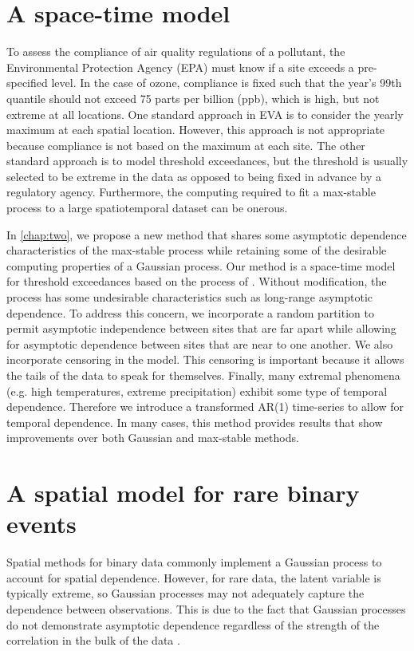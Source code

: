 \section{A space-time \skewt{} model}

To assess the compliance of air quality regulations of a pollutant, the Environmental Protection Agency (EPA) must know if a site exceeds a pre-specified level.
In the case of ozone, compliance is fixed such that the year's 99th quantile should not exceed 75 parts per billion (ppb), which is high, but not extreme at all locations.
One standard approach in EVA is to consider the yearly maximum at each spatial location.
However, this approach is not appropriate because compliance is not based on the maximum at each site.
The other standard approach is to model threshold exceedances, but the threshold is usually selected to be extreme in the data as opposed to being fixed in advance by a regulatory agency.
Furthermore, the computing required to fit a max-stable process to a large spatiotemporal dataset can be onerous.

In \cref{chap:two}, we propose a new method that shares some asymptotic dependence characteristics of the max-stable process while retaining some of the desirable computing properties of a Gaussian process.
Our method is a space-time model for threshold exceedances based on the \skewt{} process of \citet{Azzalini2014}.
Without modification, the \skewt{} process has some undesirable characteristics such as long-range asymptotic dependence.
To address this concern, we incorporate a random partition to permit asymptotic independence between sites that are far apart while allowing for asymptotic dependence between sites that are near to one another.
We also incorporate censoring in the model.
This censoring is important because it allows the tails of the data to speak for themselves. 
Finally, many extremal phenomena (e.g. high temperatures, extreme precipitation) exhibit some type of temporal dependence.
Therefore we introduce a transformed AR(1) time-series to allow for temporal dependence.
In many cases, this method provides results that show improvements over both Gaussian and max-stable methods.

\section{A spatial model for rare binary events}

Spatial methods for binary data commonly implement a Gaussian process to account for spatial dependence.
However, for rare data, the latent variable is typically extreme, so Gaussian processes may not adequately capture the dependence between observations.
This is due to the fact that Gaussian processes do not demonstrate asymptotic dependence regardless of the strength of the correlation in the bulk of the data \citep{Sibuya1960}.

